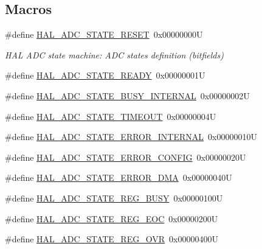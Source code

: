 \subsection*{Macros}
\begin{DoxyCompactItemize}
\item 
\#define \hyperlink{group___a_d_c___exported___types_ga3f995b6dedd7366d0663f852511b9104}{H\+A\+L\+\_\+\+A\+D\+C\+\_\+\+S\+T\+A\+T\+E\+\_\+\+R\+E\+S\+ET}~0x00000000U
\begin{DoxyCompactList}\small\item\em H\+AL A\+DC state machine\+: A\+DC states definition (bitfields) \end{DoxyCompactList}\item 
\#define \hyperlink{group___a_d_c___exported___types_gadccf2475d321f82bc5b18b4c0031794b}{H\+A\+L\+\_\+\+A\+D\+C\+\_\+\+S\+T\+A\+T\+E\+\_\+\+R\+E\+A\+DY}~0x00000001U
\item 
\#define \hyperlink{group___a_d_c___exported___types_ga7055248355e179ee208d23bd2ce8ba69}{H\+A\+L\+\_\+\+A\+D\+C\+\_\+\+S\+T\+A\+T\+E\+\_\+\+B\+U\+S\+Y\+\_\+\+I\+N\+T\+E\+R\+N\+AL}~0x00000002U
\item 
\#define \hyperlink{group___a_d_c___exported___types_gaaa31ad8c2f5337eac601534cb581dd15}{H\+A\+L\+\_\+\+A\+D\+C\+\_\+\+S\+T\+A\+T\+E\+\_\+\+T\+I\+M\+E\+O\+UT}~0x00000004U
\item 
\#define \hyperlink{group___a_d_c___exported___types_ga65b592627f1f9277f4b89bfc33a9e641}{H\+A\+L\+\_\+\+A\+D\+C\+\_\+\+S\+T\+A\+T\+E\+\_\+\+E\+R\+R\+O\+R\+\_\+\+I\+N\+T\+E\+R\+N\+AL}~0x00000010U
\item 
\#define \hyperlink{group___a_d_c___exported___types_ga22d43a637ce63e13e33f5a0f1d4564fd}{H\+A\+L\+\_\+\+A\+D\+C\+\_\+\+S\+T\+A\+T\+E\+\_\+\+E\+R\+R\+O\+R\+\_\+\+C\+O\+N\+F\+IG}~0x00000020U
\item 
\#define \hyperlink{group___a_d_c___exported___types_ga5a1b4881d17e72aa0823797958221172}{H\+A\+L\+\_\+\+A\+D\+C\+\_\+\+S\+T\+A\+T\+E\+\_\+\+E\+R\+R\+O\+R\+\_\+\+D\+MA}~0x00000040U
\item 
\#define \hyperlink{group___a_d_c___exported___types_ga516d4b4ebc261c241c69d96aae19acc3}{H\+A\+L\+\_\+\+A\+D\+C\+\_\+\+S\+T\+A\+T\+E\+\_\+\+R\+E\+G\+\_\+\+B\+U\+SY}~0x00000100U
\item 
\#define \hyperlink{group___a_d_c___exported___types_gae2da191bffb720a553a1e39c10929711}{H\+A\+L\+\_\+\+A\+D\+C\+\_\+\+S\+T\+A\+T\+E\+\_\+\+R\+E\+G\+\_\+\+E\+OC}~0x00000200U
\item 
\#define \hyperlink{group___a_d_c___exported___types_ga1f99cd51b6636d9f60bc68dacb01eb10}{H\+A\+L\+\_\+\+A\+D\+C\+\_\+\+S\+T\+A\+T\+E\+\_\+\+R\+E\+G\+\_\+\+O\+VR}~0x00000400U

\end{DoxyCompactItemize}
